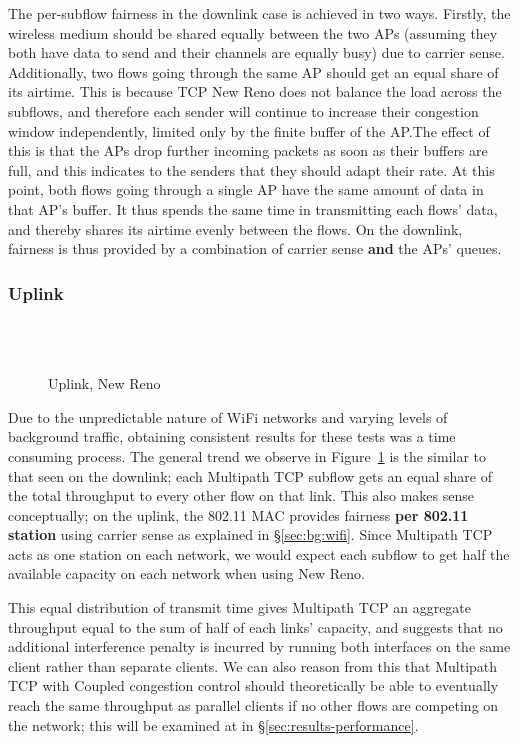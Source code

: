 The per-subflow fairness in the downlink case is achieved in two ways. Firstly,
the wireless medium should be shared equally between the two APs (assuming they
both have data to send and their channels are equally busy) due to carrier
sense. Additionally, two flows going through the same AP should get an equal share of 
its airtime. This is because TCP New Reno does not balance the load across the subflows, and therefore each sender will continue to increase their congestion window independently, limited only by the finite buffer of the AP.\@ The effect of this is that the APs drop further incoming packets as soon as their buffers are full, and this indicates to the senders that they should adapt their rate. At this point, both flows going through a single AP have the same amount of data in that AP's buffer. It thus spends the same time in transmitting each flows' data, and thereby shares its airtime evenly between the flows. On the downlink, fairness is thus provided by a combination of carrier sense \textbf{and} the APs' queues.

\subsubsection{Uplink}
\label{sec:results-mptcp-up}

\begin{figure}[h]
  \centering
  \\
  \subfloat[][2.4 GHz, non-overlapping channels] {\
    \scalebox{0.70}{}\label{graph:cc-reno-up}
  }
  \\
  \subfloat[][5 and 2.4 GHz] {\
    \scalebox{0.70}{}\label{graph:cb-reno-up}
  }
  \caption{Uplink, New Reno}\label{graph:reno-up}
\end{figure}

Due to the unpredictable nature of WiFi networks and varying levels of background
traffic, obtaining consistent results for these tests was a time consuming
process. The general trend we observe in Figure~\ref{graph:reno-up} is the
similar to that seen on the downlink; each Multipath TCP subflow gets an equal
share of the total throughput to every other flow on that link. This also makes
sense conceptually; on the uplink, the 802.11 MAC provides fairness
\textbf{per 802.11 station} using carrier sense as explained in
\S\ref{sec:bg:wifi}.
Since Multipath TCP acts as one station on each network,
we would expect each subflow to get half the available capacity on each network
when using New Reno.

This equal distribution of transmit time gives Multipath TCP an aggregate throughput equal
to the sum of half of each links' capacity, and suggests that no additional interference
penalty is incurred by running both interfaces on the same client rather than
separate clients. We can also reason from this that Multipath TCP with Coupled
congestion control should theoretically be able to eventually reach the same
throughput as parallel clients if no other flows are competing on the network; 
this will be examined at in \S\ref{sec:results-performance}.

